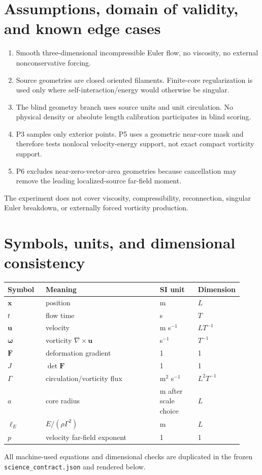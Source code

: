 \documentclass[11pt,a4paper]{article}
\newcommand{\vort}{\boldsymbol{\omega}}
\newcommand{\vel}{\mathbf{u}}
\newcommand{\Fmat}{\mathbf{F}}
\begin{document}
\section{Assumptions, domain of validity, and known edge cases}
\begin{enumerate}[label=A\arabic*.]
\item Smooth three-dimensional incompressible Euler flow, no viscosity, no external nonconservative forcing.
\item Source geometries are closed oriented filaments. Finite-core regularization is used only where self-interaction/energy would otherwise be singular.
\item The blind geometry branch uses source units and unit circulation. No physical density or absolute length calibration participates in blind scoring.
\item P3 samples only exterior points. P5 uses a geometric near-core mask and therefore tests nonlocal velocity-energy support, not exact compact vorticity support.
\item P6 excludes near-zero-vector-area geometries because cancellation may remove the leading localized-source far-field moment.
\end{enumerate}
The experiment does not cover viscosity, compressibility, reconnection, singular Euler breakdown, or externally forced vorticity production.

\section{Symbols, units, and dimensional consistency}
\begin{longtable}{p{0.16\linewidth}p{0.48\linewidth}p{0.16\linewidth}p{0.12\linewidth}}
\toprule
Symbol & Meaning & SI unit & Dimension \\
\midrule
$\mathbf{x}$ & position & m & $L$ \\
$t$ & flow time & s & $T$ \\
$\vel$ & velocity & m s$^{-1}$ & $LT^{-1}$ \\
$\vort$ & vorticity $\nabla\times\vel$ & s$^{-1}$ & $T^{-1}$ \\
$\Fmat$ & deformation gradient & 1 & 1 \\
$J$ & $\det\Fmat$ & 1 & 1 \\
$\Gamma$ & circulation/vorticity flux & m$^2$ s$^{-1}$ & $L^2T^{-1}$ \\
$a$ & core radius & m after scale choice & $L$ \\
$\ell_E$ & $E/(\rho\Gamma^2)$ & m & $L$ \\
$p$ & velocity far-field exponent & 1 & 1 \\
\bottomrule
\end{longtable}
All machine-used equations and dimensional checks are duplicated in the frozen \texttt{science\_contract.json} and rendered below.
\end{document}
